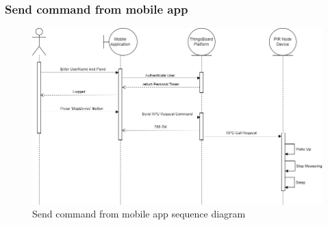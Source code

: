 \subsubsection*{Send command from mobile app}

\begin{figure}[H]
    \centering
    \includegraphics[width=1\textwidth]{./images/6/SendCommandApp.png}
    \caption{Send command from mobile app sequence diagram}
\end{figure}

